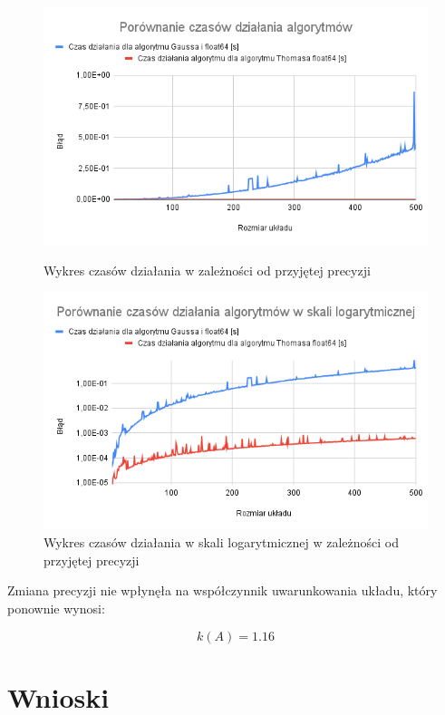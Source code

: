 \documentclass{article}
\begin{document}
\begin{figure}[H]
  \begin{minipage}[b]{0.49\textwidth}
    \includegraphics[width=\textwidth]{img14.png}
    \caption{Wykres czasów działania w zależności od przyjętej precyzji}
  \end{minipage}
  \hfill
  \begin{minipage}[b]{0.49\textwidth}
    \includegraphics[width=\textwidth]{img15.png}
    \caption{Wykres czasów działania w skali logarytmicznej w zależności od przyjętej precyzji}
  \end{minipage}
\end{figure}

Zmiana precyzji nie wpłynęła na współczynnik uwarunkowania układu, który ponownie wynosi:

\[k(A) = 1.16\]

\newpage

\section{Wnioski}
\end{document}
